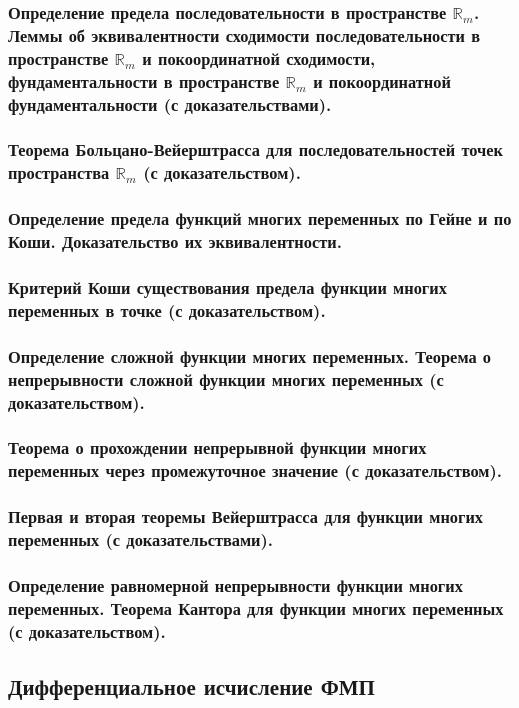 \documentclass[10pt]{article}
\begin{document}
    \subsubsection{Определение предела последовательности в пространстве \texorpdfstring{$\mathbb{R}_m$}{Rm}. Леммы об эквивалентности сходимости последовательности в пространстве \texorpdfstring{$\mathbb{R}_m$}{Rm} и покоординатной сходимости, фундаментальности в пространстве \texorpdfstring{$\mathbb{R}_m$}{Rm} и покоординатной фундаментальности (с доказательствами).}
    \subsubsection{Теорема Больцано-Вейерштрасса для последовательностей точек пространства \texorpdfstring{$\mathbb{R}_m$}{Rm} (с доказательством).}
    \subsubsection{Определение предела функций многих переменных по Гейне и по Коши. Доказательство их эквивалентности.}
    \subsubsection{Критерий Коши существования предела функции многих переменных в точке (с доказательством).}
    \subsubsection{Определение сложной функции многих переменных. Теорема о непрерывности сложной функции многих переменных (с доказательством).}
    \subsubsection{Теорема о прохождении непрерывной функции многих переменных через промежуточное значение (с доказательством).}
    \subsubsection{Первая и вторая теоремы Вейерштрасса для функции многих переменных (с доказательствами).}
    \subsubsection{Определение равномерной непрерывности функции многих переменных. Теорема Кантора для функции многих переменных (с доказательством).}
    \subsection{Дифференциальное исчисление ФМП}
\end{document}
